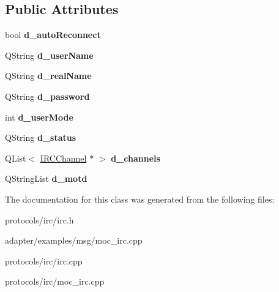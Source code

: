 \subsection*{Public Attributes}
\begin{DoxyCompactItemize}
\item 
\hypertarget{classirc_1_1IRCClient_a0e48484194aed3ae8b71ae49b001552e}{
bool {\bfseries d\_\-autoReconnect}}
\label{classirc_1_1IRCClient_a0e48484194aed3ae8b71ae49b001552e}

\item 
\hypertarget{classirc_1_1IRCClient_a347fd4e47335739ca35cece548dc5377}{
QString {\bfseries d\_\-userName}}
\label{classirc_1_1IRCClient_a347fd4e47335739ca35cece548dc5377}

\item 
\hypertarget{classirc_1_1IRCClient_a63806888226610ad474fe3f56c7ab718}{
QString {\bfseries d\_\-realName}}
\label{classirc_1_1IRCClient_a63806888226610ad474fe3f56c7ab718}

\item 
\hypertarget{classirc_1_1IRCClient_aa9084124feae86658692271fc5e957ee}{
QString {\bfseries d\_\-password}}
\label{classirc_1_1IRCClient_aa9084124feae86658692271fc5e957ee}

\item 
\hypertarget{classirc_1_1IRCClient_a97881754ce72351d57cc5550281c15bf}{
int {\bfseries d\_\-userMode}}
\label{classirc_1_1IRCClient_a97881754ce72351d57cc5550281c15bf}

\item 
\hypertarget{classirc_1_1IRCClient_ad157785b39186b34b76c3ebcc324d79a}{
QString {\bfseries d\_\-status}}
\label{classirc_1_1IRCClient_ad157785b39186b34b76c3ebcc324d79a}

\item 
\hypertarget{classirc_1_1IRCClient_a4d523656cd657949cc66c02fc7164b54}{
QList$<$ \hyperlink{classirc_1_1IRCChannel}{IRCChannel} $\ast$ $>$ {\bfseries d\_\-channels}}
\label{classirc_1_1IRCClient_a4d523656cd657949cc66c02fc7164b54}

\item 
\hypertarget{classirc_1_1IRCClient_a797303797e53ecb9e31760e3e37e0af2}{
QStringList {\bfseries d\_\-motd}}
\label{classirc_1_1IRCClient_a797303797e53ecb9e31760e3e37e0af2}

\end{DoxyCompactItemize}


The documentation for this class was generated from the following files:\begin{DoxyCompactItemize}
\item 
protocols/irc/irc.h\item 
adapter/examples/msg/moc\_\-irc.cpp\item 
protocols/irc/irc.cpp\item 
protocols/irc/moc\_\-irc.cpp\end{DoxyCompactItemize}
